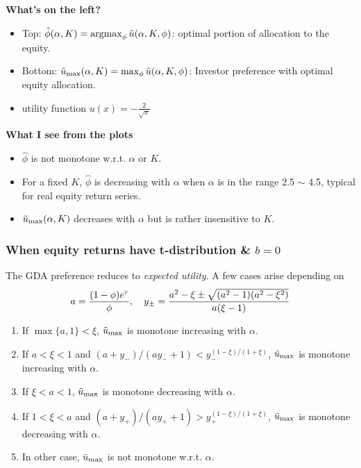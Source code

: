 \documentclass{beamer}
\begin{document}
\begin{frame}
\begin{minipage}[t]{0.4\linewidth}
\begin{figure}[htb!]
\begin{minipage}{\linewidth}
      \end{minipage}
    \end{figure}
  \end{minipage}\hfill
  \begin{minipage}[t]{0.6\linewidth}
    \begin{small}
      \textcolor[HTML]{990033}{\bf What's on the left?}
      \begin{itemize}
      \item Top: $\hat \phi(\alpha, K) = \operatorname*{argmax}_{\phi} \tilde u(\alpha, K, \phi)$:
        optimal portion of allocation to the equity.
      \item Bottom: $\tilde u_{\rm max}(\alpha, K) = \max_{\phi} \tilde
        u(\alpha, K, \phi)$:
        Investor preference with optimal equity allocation.
      \item utility function $u(x) = -\frac{2}{\sqrt x}$
      \end{itemize}
      
      \textcolor[HTML]{990033}{\bf What I see from the plots}
      \begin{itemize}
      \item $\hat \phi$ is not monotone w.r.t. $\alpha$ or $K$.
      \item For a fixed $K$, $\hat \phi$ is decreasing with $\alpha$
        when $\alpha$ is in the range 2.5 $\sim$ 4.5, typical for real
        equity return series.
      \item $\tilde u_{\rm max}(\alpha, K)$ decreases with $\alpha$ 
        but is rather insensitive to $K$.
      \end{itemize}
    \end{small}
  \end{minipage}
\end{frame}

\begin{frame}
  \frametitle{When equity returns have t-distribution \& $b = 0$}
  The GDA preference reduces to {\em expected utility}. A few cases
  arise depending on
  \[
  a = {
    (1 - \phi) e^r
    \over
    \phi
  }, \quad
  y_\pm = {
    a^2 - \xi \pm \sqrt{(a^2 - 1) (a^2 - \xi^2)}
    \over
    a (\xi - 1)
  }
  \]
\begin{enumerate}
\item If $\max\{a, 1\} < \xi$, $\tilde u_{\rm max}$ is
  monotone increasing with $\alpha$.
\item If $a < \xi < 1$ and $(a + y_-)/(a y_- + 1) <
  y_-^{(1-\xi)/(1+\xi)}$, $\tilde u_{\rm max}$ is monotone
  increasing with $\alpha$.
\item If $\xi < a < 1$, $\tilde u_{\rm max}$ is monotone
  decreasing with $\alpha$.
\item If $1 < \xi < a$ and $(a + y_+)/(a y_+ + 1) >
  y_+^{(1-\xi)/(1+\xi)}$, $\tilde u_{\rm max}$ is monotone
  decreasing with $\alpha$.
\item In other case, $\tilde u_{\rm max}$ is not monotone
  w.r.t. $\alpha$.
\end{enumerate}
\end{frame}
\end{document}
